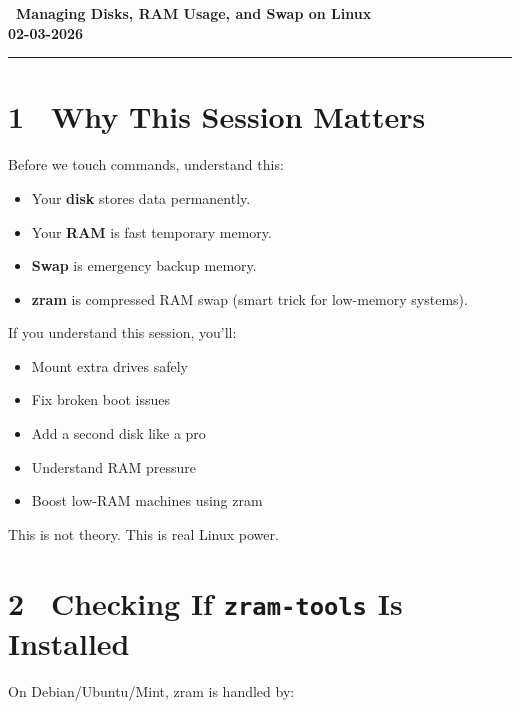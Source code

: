 \documentclass[12pt]{article}
\newcommand{\courseTitle}{Managing Disks, RAM Usage, and Swap on Linux}
\newcommand{\courseDate}{02-03-2026}
\newcommand{\diskon}{\faHdd}              %
\begin{document}
\begin{center}
\headingfont\Huge\bfseries\color{navy}
\diskon\ \courseTitle\\[0.5em]
\Large\color{teamred}
\courseDate
\end{center}

\vspace{1em}
\begin{center}
\color{teamred}\rule{0.8\textwidth}{1pt}
\end{center}

\section*{1 \faQuestionCircle\ Why This Session Matters}

Before we touch commands, understand this:

\begin{itemize}
    \item Your \textbf{disk} stores data permanently.
    \item Your \textbf{RAM} is fast temporary memory.
    \item \textbf{Swap} is emergency backup memory.
    \item \textbf{zram} is compressed RAM swap (smart trick for low-memory systems).
\end{itemize}

If you understand this session, you'll:

\begin{itemize}
    \item Mount extra drives safely
    \item Fix broken boot issues
    \item Add a second disk like a pro
    \item Understand RAM pressure
    \item Boost low-RAM machines using zram
\end{itemize}

\begin{infobox}
This is not theory. This is real Linux power.
\end{infobox}

\section*{2 \faSearch\ Checking If \texttt{zram-tools} Is Installed}

On Debian/Ubuntu/Mint, zram is handled by:
\end{document}
